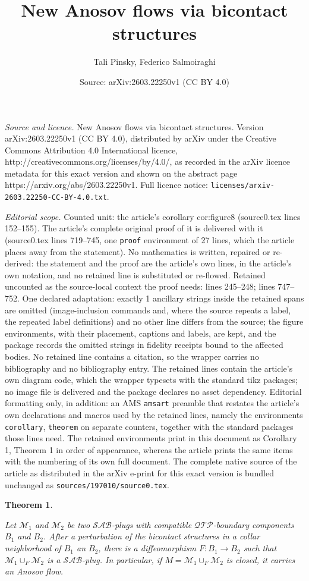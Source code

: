 \documentclass[10pt,a4paper]{amsart}
\title{New Anosov flows via bicontact structures}
\author{Tali Pinsky, Federico Salmoiraghi}
\date{Source: arXiv:2603.22250v1 (CC BY 4.0)}
\newtheorem{theorem}{Theorem}
\begin{document}
\maketitle

\noindent\emph{Source and licence.} New Anosov flows via bicontact structures. Version arXiv:2603.22250v1 (CC BY 4.0), distributed by arXiv under the Creative Commons Attribution 4.0 International licence, http://creativecommons.org/licenses/by/4.0/, as recorded in the arXiv licence metadata for this exact version and shown on the abstract page https://arxiv.org/abs/2603.22250v1. Full licence notice: \texttt{licenses/arxiv-2603.22250-CC-BY-4.0.txt}.\par\smallskip

\noindent\textit{Editorial scope.} Counted unit: the article's corollary cor:figure8 (source0.tex lines 152--155). The article's complete original proof of it is delivered with it (source0.tex lines 719--745, one \texttt{proof} environment of 27 lines, which the article places away from the statement). No mathematics is written, repaired or re-derived: the statement and the proof are the article's own lines, in the article's own notation, and no retained line is substituted or re-flowed.  Retained uncounted as the source-local context the proof needs: lines 245--248; lines 747--752.  One declared adaptation: exactly 1 ancillary strings inside the retained spans are omitted (image-inclusion commands and, where the source repeats a label, the repeated label definitions) and no other line differs from the source; the figure environments, with their placement, captions and labels, are kept, and the package records the omitted strings in fidelity receipts bound to the affected bodies.  No retained line contains a citation, so the wrapper carries no bibliography and no bibliography entry.  The retained lines contain the article's own diagram code, which the wrapper typesets with the standard tikz packages; no image file is delivered and the package declares no asset dependency.  Editorial formatting only, in addition: an AMS \texttt{amsart} preamble that restates the article's own declarations and macros used by the retained lines, namely the environments \texttt{corollary}, \texttt{theorem} on separate counters, together with the standard packages those lines need.  The retained environments print in this document as Corollary 1, Theorem 1 in order of appearance, whereas the article prints the same items with the numbering of its own full document.  The complete native source of the article as distributed in the arXiv e-print for this exact version is bundled unchanged as \texttt{sources/197010/source0.tex}.
\begin{theorem}\label{thm: gluing plugs}

Let $\mathcal{M}_1$ and $\mathcal{M}_2$ be two $\mathcal{SAB}$-plugs with compatible $\mathcal{QTP}$-boundary components $B_1$ and $B_2$. After a perturbation of the bicontact structures in a collar neighborhood of $B_1$ an $B_2$, there is a diffeomorphism $F:B_1\rightarrow B_2$ such that $\mathcal{M}_1 \cup_F \mathcal{M}_2$ is a $\mathcal{SAB}$-plug. In particular, if $M=\mathcal{M}_1 \cup_F \mathcal{M}_2$ is closed, it carries an Anosov flow.
\end{theorem}
\end{document}
